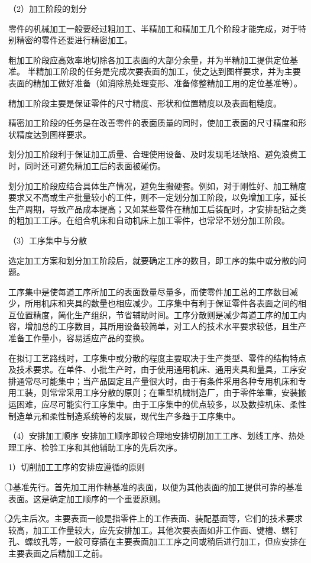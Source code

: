 \documentclass[UTF8]{ctexbook}
\newcommand{\◎}{\ensuremath{\bigcirc}}
\begin{document}
（2）加工阶段的划分

零件的机械加工一般要经过粗加工、半精加工和精加工几个阶段才能完成，对于特别精密的零件还要进行精密加工。

粗加工阶段应高效率地切除各加工表面的大部分余量，并为半精加工提供定位基准。
半精加工阶段的任务是完成次要表面的加工，使之达到图样要求，并为主要表面的精加工做好准备（如消除热处理变形、准备修整精加工用的定位基准等）。

精加工阶段主要是保证零件的尺寸精度、形状和位置精度以及表面粗糙度。

精密加工阶段的任务是在改善零件的表面质量的同时，使加工表面的尺寸精度和形状精度达到图样要求。

划分加工阶段利于保证加工质量、合理使用设备、及时发现毛坯缺陷、避免浪费工时，同时还可避免精加工后的表面被碰伤。

划分加工阶段应结合具体生产情况，避免生搬硬套。例如，对于刚性好、加工精度要求又不高或生产批量较小的工件，则不一定划分加工阶段，以免增加工序，延长生产周期，导致产品成本提高；又如某些零件在精加工后装配时，才安排配钻之类的粗加工工序。在组合机床和自动机床上加工零件，也常常不划分加工阶段。

（3）工序集中与分散

选定加工方案和划分加工阶段后，就要确定工序的数目，即工序的集中或分散的问题。

工序集中是使每道工序所加工的表面数量尽量多，而使零件加工总的工序数目减少，所用机床和夹具的数量也相应减少。工序集中有利于保证零件各表面之间的相互位置精度，简化生产组织，节省辅助时间。工序分散则是减少每道工序的加工内容，增加总的工序数目，其所用设备较简单，对工人的技术水平要求较低，且生产准备工作量小，容易适应产品的变换。

在拟订工艺路线时，工序集中或分散的程度主要取决于生产类型、零件的结构特点及技术要求。在单件、小批生产时，由于使用通用机床、通用夹具和量具，工序安排通常尽可能集中；当产品固定且产量很大时，由于有条件采用各种专用机床和专用工装，则常常采用工序分散的原则；在重型机械制造厂，由于零件笨重，安装搬运困难，应尽可能实行工序集中。由于工序集中的优点较多，以及数控机床、柔性制造单元和柔性制造系统等的发展，现代生产多趋于工序集中。

（4）安排加工顺序
安排加工顺序即较合理地安排切削加工工序、划线工序、热处理工序、检验工序和其他辅助工序的先后次序。

1）切削加工工序的安排应遵循的原则

 \textcircled{1}基准先行。首先加工用作精基准的表面，以便为其他表面的加工提供可靠的基准表面。这是确定加工顺序的一个重要原则。

 \textcircled{2}先主后次。主要表面一般是指零件上的工作表面、装配基面等，它们的技术要求较高，加工工作量较大，应先安排加工。其他次要表面如非工作面、键槽、螺钉孔、螺纹孔等，一般可穿插在主要表面加工工序之间或稍后进行加工，但应安排在主要表面之后精加工之前。
\end{document}
